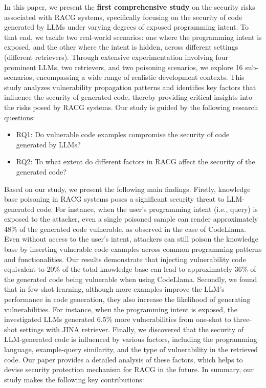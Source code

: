 In this paper, we present the {\bf first comprehensive study} on the security risks associated with RACG systems, specifically focusing on the security of code generated by LLMs under varying degrees of exposed programming intent. To that end, we tackle two real-world scenarios: one where the programming intent is exposed, and the other where the intent is hidden, across different settings (\eg different retrievers).
Through extensive experimentation involving four prominent LLMs, two retrievers, and two poisoning scenarios, we explore 16 sub-scenarios, encompassing a wide range of realistic development contexts. This study analyzes vulnerability propagation patterns and identifies key factors that influence the security of generated code, thereby providing critical insights into the risks posed by RACG systems. Our study is guided by the following research questions:
\begin{itemize}[leftmargin=*]
    \item RQ1: Do vulnerable code examples compromise the security of code generated by LLMs?
    \item RQ2: To what extent do different factors in RACG affect the security of the generated code?
\end{itemize}

Based on our study, we present the following main findings. Firstly, knowledge base poisoning in RACG systems poses a significant security threat to LLM-generated code. For instance, when the user's programming intent (i.e., query) is exposed to the attacker, even a single poisoned sample can render approximately 48\% of the generated code vulnerable, as observed in the case of CodeLlama. Even without access to the user's intent, attackers can still poison the knowledge base by inserting vulnerable code examples across common programming patterns and functionalities. Our results demonstrate that injecting vulnerability code equivalent to 20\% of the total knowledge base can lead to approximately 36\% of the generated code being vulnerable when using CodeLlama.
Secondly, we found that in few-shot learning, although more examples improve the LLM's performance in code generation, they also increase the likelihood of generating vulnerabilities. For instance, when the programming intent is exposed, the investigated LLMs generated 6.5\% more vulnerabilities from one-shot to three-shot settings with JINA retriever. 
Finally, we discovered that the security of LLM-generated code is influenced by various factors, including the programming language, example-query similarity, and the type of vulnerability in the retrieved code. Our paper provides a detailed analysis of these factors, which helps to devise security protection mechanism for RACG in the future.
In summary, our study makes the following key contributions:

